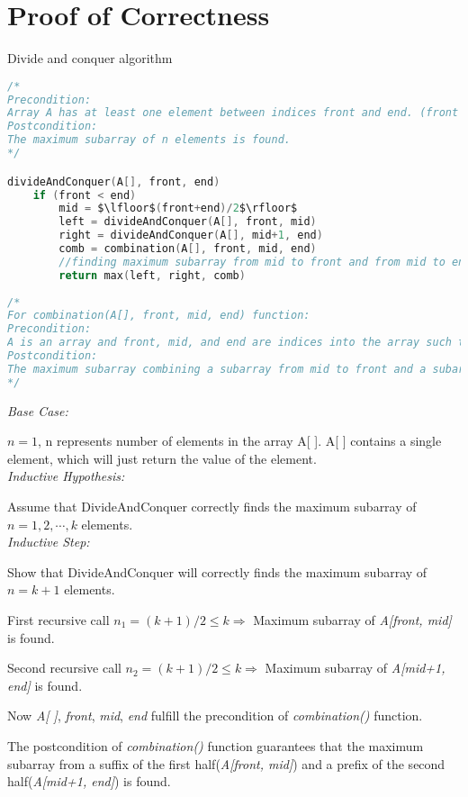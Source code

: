 \documentclass[11pt]{scrreprt}
\begin{document}
\chapter{Proof of Correctness}

Divide and conquer algorithm

\begin{lstlisting}[language=c,mathescape=true]
/*
Precondition: 
Array A has at least one element between indices front and end. (front < end)
Postcondition: 
The maximum subarray of n elements is found. 
*/

divideAndConquer(A[], front, end)
	if (front < end)
		mid = $\lfloor$(front+end)/2$\rfloor$
		left = divideAndConquer(A[], front, mid)
		right = divideAndConquer(A[], mid+1, end)
		comb = combination(A[], front, mid, end)		
		//finding maximum subarray from mid to front and from mid to end.
		return max(left, right, comb)
		
/*
For combination(A[], front, mid, end) function:
Precondition: 
A is an array and front, mid, and end are indices into the array such that front <= mid < end.
Postcondition: 
The maximum subarray combining a subarray from mid to front and a subarray from mid to end is found.
*/
\end{lstlisting}
\emph{Base Case:} 

$n = 1$, n represents number of elements in the array A[ ]. A[ ] contains a single element, which will just return the value of the element. \\
\emph{Inductive Hypothesis:} 

Assume that DivideAndConquer correctly finds the maximum subarray of $n=1, 2,\cdots, k$ elements. \\
\emph{Inductive Step:} 

Show that DivideAndConquer will correctly finds the maximum subarray of $n= k+1$ elements. 

First recursive call $n_1=(k+1)/2\leq k\Rightarrow $ Maximum subarray of \textit{A[front, mid]} is found.

Second recursive call $n_2=(k+1)/2 \leq k \Rightarrow$ Maximum subarray of \textit{A[mid+1, end]} is found.

Now \textit{A[ ]}, \textit{front}, \textit{mid}, \textit{end} fulfill the precondition of \textit{combination()} function.

The postcondition of \textit{combination()} function guarantees that the maximum subarray from a suffix of the first half(\textit{A[front, mid]}) and a prefix of the second half(\textit{A[mid+1, end]}) is found.
\end{document}
